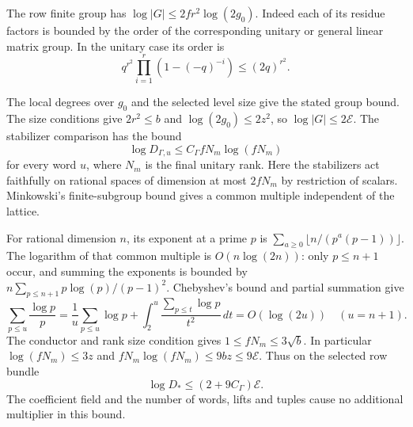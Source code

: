 The row finite group has
\(\log|G|\le 2fr^2\log(2g_0)\).
Indeed each of its residue factors is bounded by the order of
the corresponding unitary or general linear matrix group.
In the unitary case its order is
\[
 q^{r^2}\prod_{i=1}^r(1-(-q)^{-i})\le (2q)^{r^2}.
\]

The local degrees over \(g_0\) and the selected level size give
the stated group bound. The size conditions give \(2r^2\le b\)
and \(\log(2g_0)\le2z^2\), so \(\log|G|\le2\mathcal E\).
The stabilizer comparison has the bound
\[
 \log D_{\Gamma,u}\le C_\Gamma fN_m\log(fN_m)
\]
for every
word \(u\), where \(N_m\) is the final unitary rank. Here the
stabilizers act faithfully on rational spaces of dimension
at most \(2fN_m\) by restriction of scalars. Minkowski's
finite-subgroup bound gives a common multiple independent
of the lattice.

For rational dimension \(n\), its exponent
at a prime \(p\) is
\(\sum_{a\ge0}\lfloor n/(p^a(p-1))\rfloor\).
The logarithm of that common multiple is \(O(n\log(2n))\):
only \(p\le n+1\) occur, and summing the exponents is
bounded by \(n\sum_{p\le n+1} p\log(p)/(p-1)^2\).
Chebyshev's bound and partial summation give
\[
 \sum_{p\le u}\frac{\log p}{p}=\frac{1}{u}\sum_{p\le u}\log p+\int_2^u\frac{\sum_{p\le t}\log p}{t^2}\,dt=O(\log(2u))\quad(u=n+1).
\]
\cite{serre-finite-orders}
The conductor and rank size condition gives
\(1\le fN_m\le3\sqrt b\). In particular
\(\log(fN_m)\le3z\) and
\(fN_m\log(fN_m)\le9bz\le9\mathcal E\).
Thus on the selected row bundle
\begin{equation}\label{eq:division-class-bound}
                \log D_*\le(2+9C_\Gamma)\mathcal E .
\end{equation}
The coefficient field and the number of words, lifts and
tuples cause no additional multiplier in this bound.
\label{cor:division-length-9}
